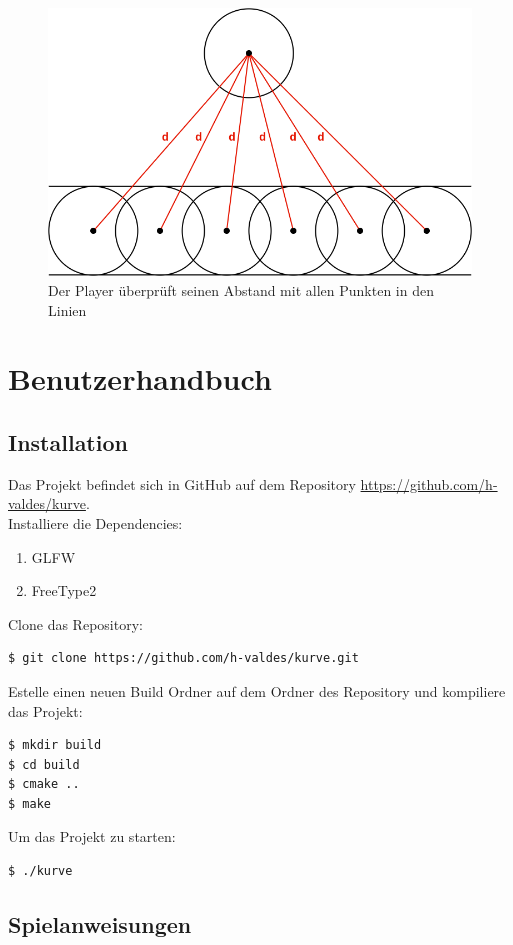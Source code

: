 \documentclass[doktyp=studarbeit]{TUBAFarbeiten}
\begin{document}
\begin{figure}[!htb]
    \centering
    \includegraphics[width=0.6\linewidth]{collisions-2.png}
    \caption{Der Player überprüft seinen Abstand mit allen Punkten in den Linien}
    \label{fig:collisions-2}
\end{figure}

\section{Benutzerhandbuch}

\subsection{Installation}
Das Projekt befindet sich in GitHub auf dem Repository 
\url{https://github.com/h-valdes/kurve}. \\

Installiere die Dependencies:
\begin{enumerate}
    \item GLFW
    \item FreeType2
\end{enumerate}

Clone das Repository:
\begin{lstlisting}[language=bash]
$ git clone https://github.com/h-valdes/kurve.git
\end{lstlisting}

Estelle einen neuen Build Ordner auf dem Ordner des Repository und 
kompiliere das Projekt:
\begin{lstlisting}[language=bash]
$ mkdir build
$ cd build
$ cmake ..
$ make
\end{lstlisting}

Um das Projekt zu starten:
\begin{lstlisting}[language=bash]
$ ./kurve
\end{lstlisting}

\FloatBarrier
\subsection{Spielanweisungen}
\end{document}

